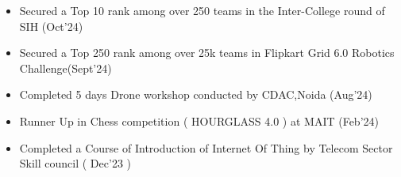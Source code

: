 \documentclass[10pt,a4paper,ragged2e]{altacv}
\begin{document}
\begin{itemize}

\item\linespread{1.2}Secured a Top 10 rank among over 250 teams in the Inter-College round of SIH (Oct'24)

\item\linespread{1.2}Secured a Top 250 rank among over 25k teams in Flipkart Grid 6.0 Robotics Challenge(Sept'24)

\item\linespread{1.2} Completed 5 days Drone workshop conducted by CDAC,Noida (Aug’24)

\item\linespread{1.2}  Runner Up in Chess competition ( HOURGLASS 4.0 ) at MAIT (Feb’24)


\item  Completed a Course of Introduction of Internet Of Thing by Telecom Sector Skill council ( Dec’23 )
\end{itemize}

\clearpage
\end{document}

